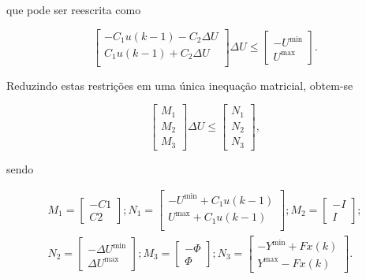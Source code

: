 que pode ser reescrita como

\begin{equation}
	\label{eq:generic-restriction-u-matrix-form}
	\begin{bmatrix}
		-C_1u(k-1) - C_2\Delta{}U \\
		C_1u(k-1) + C_2\Delta{}U  \\
	\end{bmatrix} \Delta{}U \le
	\begin{bmatrix}
		-U^{\min} \\
		U^{\max}
	\end{bmatrix}.
\end{equation}

Reduzindo estas restrições em uma única inequação matricial, obtem-se

\begin{equation}
	\label{eq:generic-restriction-matrix}
	\begin{bmatrix}
		M_1 \\
		M_2 \\
		M_3
	\end{bmatrix} \Delta{}U \le
	\begin{bmatrix}
		N_1 \\
		N_2 \\
		N_3
	\end{bmatrix},
\end{equation}

sendo

\begin{equation*}
	\begin{split}
		M_1 =
		\begin{bmatrix}
			-C1 \\
			C2
		\end{bmatrix};
		N_1 =
		\begin{bmatrix}
			-U^{\min} + C_1u(k-1) \\
			U^{\max} + C_1u(k-1)  \\
		\end{bmatrix};
		M_2 =
		\begin{bmatrix}
			-I \\
			I
		\end{bmatrix}; \\
		N_2 =
		\begin{bmatrix}
			-\Delta{}U^{\min} \\
			\Delta{}U^{\max}
		\end{bmatrix};
		M_3 =
		\begin{bmatrix}
			-\Phi \\
			\Phi
		\end{bmatrix};
		N_3 =
		\begin{bmatrix}
			-Y^{\min} + Fx(k) \\
			Y^{\max} - Fx(k)
		\end{bmatrix}.
	\end{split}
\end{equation*}

